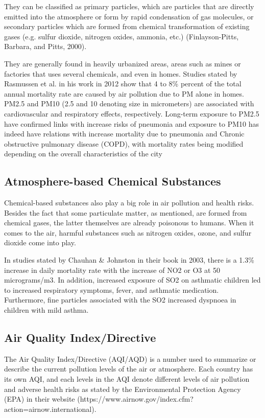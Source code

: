 \documentclass[10pt,11pt,12pt,oneside]{book}
\begin{document}
        They can be classified as primary particles, which are particles that are directly emitted into the atmosphere or form by rapid condensation of gas molecules, or secondary particles which are formed from chemical transformation of existing gases (e.g. sulfur dioxide, nitrogen oxides, ammonia, etc.) (Finlayson-Pitts, Barbara, and Pitts, 2000). 
        
        They are generally found in heavily urbanized areas, areas such as mines or factories that uses several chemicals, and even in homes. Studies stated by Rasmussen et al. in his work in 2012 show that 4 to 8\% percent of the total annual mortality rate are caused by air pollution due to PM alone in homes. PM2.5 and PM10 (2.5 and 10 denoting size in micrometers) are associated with cardiovascular and respiratory effects, respectively. Long-term exposure to PM2.5 have confirmed links with increase risks of pneumonia \cite{Neupane2010} and exposure to PM10 has indeed have relations with increase mortality due to pneumonia and Chronic obstructive pulmonary disease (COPD), with mortality rates being modified depending on the overall characteristics of the city \cite{MedinaRamn2006}
        \subsection{Atmosphere-based Chemical Substances}
        Chemical-based substances also play a big role in air pollution and health risks. Besides the fact that some particulate matter, as mentioned, are formed from chemical gases, the latter themselves are already poisonous to humans. When it comes to the air, harmful substances such as nitrogen oxides, ozone, and sulfur dioxide come into play. 
        
        In studies stated by Chauhan \& Johnston in their book in 2003, there is a 1.3\% increase in daily mortality rate with the increase of NO2 or O3 at 50 micrograms/m3. In addition, increased exposure of SO2 on asthmatic children led to increased respiratory symptoms, fever, and asthmatic medication. Furthermore, fine particles associated with the SO2 increased dyspnoea in children with mild asthma. \cite{doi:10.1093/bmb/ldg022}
        \subsection{Air Quality Index/Directive}
        The Air Quality Index/Directive (AQI/AQD) is a number used to summarize or describe the current pollution levels of the air or atmosphere. Each country has its own AQI, and each levels in the AQI denote different levels of air pollution and adverse health risks as stated by the Environmental Protection Agency (EPA) in their website (https://www.airnow.gov/index.cfm?action=airnow.international).
\end{document}
